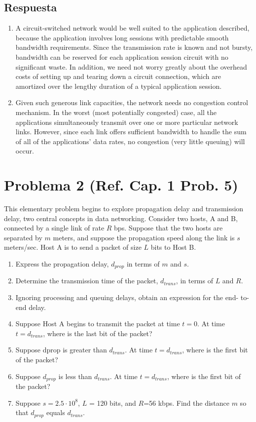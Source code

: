 \documentclass[10pt,spanish]{article}
\numberwithin{figure}{section} %
\begin{document}
\subsection*{Respuesta}

\begin{enumerate}
\item A circuit-switched network would be well suited to the application described, because the application involves long sessions with predictable smooth bandwidth requirements. Since the transmission rate is known and not bursty, bandwidth can be reserved for each application session circuit with no significant waste. In addition, we need not worry greatly about the overhead costs of setting up and tearing down a circuit connection, which are amortized over the lengthy duration of a typical application session.

\item Given such generous link capacities, the network needs no congestion control mechanism. In the worst (most potentially congested) case, all the applications simultaneously transmit over one or more particular network links. However, since each link offers sufficient bandwidth to handle the sum of all of the applications' data rates, no congestion (very little queuing) will occur.
\end{enumerate}

\section[Problema 2]{Problema 2 \textnormal{\Large{(Ref. Cap. 1 Prob. 5)}}}
This elementary problem begins to explore propagation delay and transmission delay, two central concepts in data networking. Consider two hosts, A and B, connected by a single link of rate $R$ bps. Suppose that the two hosts are separated by $m$ meters, and suppose the propagation speed along the link is $s$ meters/sec. Host A is to send a packet of size $L$ bits to Host B.
\begin{enumerate}
\item Express the propagation delay, $d_{prop}$  in terms of $m$ and $s$.
\item Determine the transmission time of the packet, $d_{trans}$, in terms of $L$ and $R$.
\item Ignoring processing and queuing delays, obtain an expression for the end- to-end delay.
\item Suppose Host A begins to transmit the packet at time $t = 0$. At time $t = d_{trans}$, where is the last bit of the packet?
\item Suppose dprop is greater than $d_{trans}$. At time $ t= d_{trans}$, where is the first bit of the packet?
\item Suppose $d_{prop}$ is less than $d_{trans}$. At time $t = d_{trans}$, where is the first bit of the packet?
\item Suppose $s = 2.5 \cdot 10^8$, $L$ = 120 bits, and $R$=56 kbps. Find the distance $m$ so that $d_{prop}$ equals $d_{trans}$.
\end{enumerate}
\end{document}
